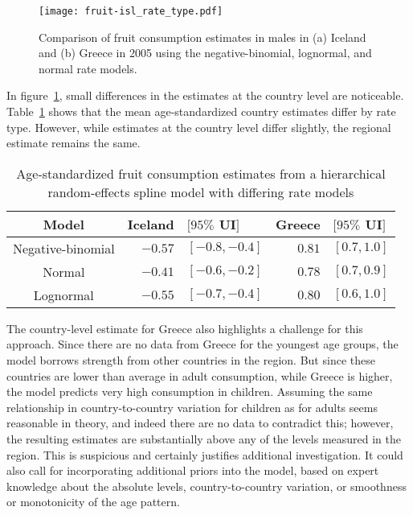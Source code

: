     \begin{figure}[h]
        \begin{center}
            \texttt{[image: fruit-isl\_rate\_type.pdf]}
            \caption[Comparison of fruit consumption estimates using different
              rate models in Iceland and Greece.]{Comparison of fruit 
              consumption estimates in males in
              (a) Iceland and (b) Greece in 2005 using the
              negative-binomial, lognormal, and normal rate models.}
            \label{fig:app-fruit countries}
        \end{center}
    \end{figure}

In figure~\ref{fig:app-fruit countries},
small differences in the estimates at the country level are noticeable.
Table~\ref{tab:app-fruit rfx} shows that the mean age-standardized
country estimates differ by rate type.  However, while estimates at
the country level differ slightly, the regional estimate remains the same.

    \begin{table}[h]
        \caption{ Age-standardized fruit consumption estimates
          from a hierarchical random-effects spline model with differing
          rate models}
        \label{tab:app-fruit rfx}
        \begin{center}
        \begin{tabular}{|c|rl|rl|}
            \hline
                Model & Iceland&$[95\%$ UI$]$ & Greece&$[95\%$ UI$]$ \\
            \hline
                Negative-binomial & $-0.57$&$ [-0.8, -0.4]$ & $0.81$&$ [0.7, 1.0]$ \\
                Normal & $-0.41$&$ [-0.6, -0.2]$ & $0.78$&$ [0.7, 0.9]$ \\
                Lognormal & $-0.55$& $[-0.7, -0.4]$ & $0.80$&$ [0.6, 1.0]$ \\
            \hline
        \end{tabular}
        \end{center}
    \end{table}

The country-level estimate for Greece also highlights a challenge for
this approach.  Since there are no data from Greece for the youngest
age groups, the model borrows strength from other countries in the
region.  But since these countries are lower than average in adult
consumption, while Greece is higher, the model predicts very high
consumption in children.  Assuming the same relationship in
country-to-country variation for children as for adults seems reasonable
in theory, and indeed there are no data to contradict this; however,
the resulting estimates are substantially above any of the levels
measured in the region.  This is suspicious and certainly justifies
additional investigation.  It could also call for incorporating
additional priors into the model, based on expert knowledge about the
absolute levels, country-to-country variation, or smoothness or
monotonicity of the age pattern.

